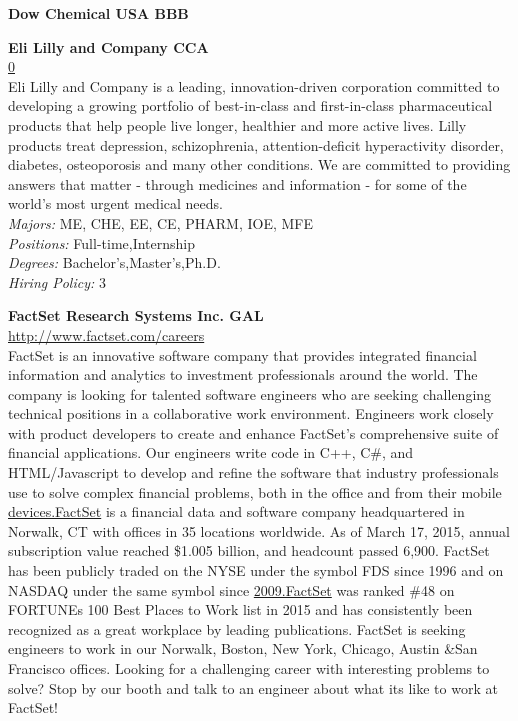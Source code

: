 \documentclass[twoside]{article}
\begin{document}
\begin{center}
\begin{multicols}{2}
\begin{minipage}{.95\columnwidth}{\Large\bf Dow Chemical USA \hfill BBB}
\end{minipage}
 \begin{minipage}{.95\columnwidth}{\Large\bf Eli Lilly and Company \hfill CCA}\\
    \url{0}\\
    Eli Lilly and Company is a leading, innovation-driven corporation committed to developing a growing portfolio of best-in-class and first-in-class pharmaceutical products that help people live longer, healthier and more active lives. Lilly products treat depression, schizophrenia, attention-deficit hyperactivity disorder, diabetes, osteoporosis and many other conditions. We are committed to providing answers that matter - through medicines and information - for some of the world's most urgent medical needs.\\
    \emph{Majors:} ME, CHE, EE, CE, PHARM, IOE, MFE\\
    \emph{Positions:} Full-time,Internship\\
    \emph{Degrees:} Bachelor's,Master's,Ph.D.\\
    \emph{Hiring Policy:} 3\\
\end{minipage}
 \begin{minipage}{.95\columnwidth}{\Large\bf FactSet Research Systems Inc. \hfill GAL}\\
    \url{http://www.factset.com/careers}\\
    FactSet is an innovative software company that provides integrated financial information and analytics to investment professionals around the world. The company is looking for talented software engineers who are seeking challenging technical positions in a collaborative work environment. Engineers work closely with product developers to create and enhance FactSet's comprehensive suite of financial applications. Our engineers write code in C++, C\#, and HTML/Javascript to develop and refine the software that industry professionals use to solve complex financial problems, both in the office and from their mobile \url{devices.FactSet} is a financial data and software company headquartered in Norwalk, CT with offices in 35 locations worldwide. As of March 17, 2015, annual subscription value reached \$1.005 billion, and headcount passed 6,900. FactSet has been publicly traded on the NYSE under the symbol FDS since 1996 and on NASDAQ under the same symbol since \url{2009.FactSet} was ranked \#48 on FORTUNEs 100 Best Places to Work list in 2015 and has consistently been recognized as a great workplace by leading publications. FactSet is seeking engineers to work in our Norwalk, Boston, New York, Chicago, Austin \&San Francisco offices. Looking for a challenging career with interesting problems to solve? Stop by our booth and talk to an engineer about what its like to work at FactSet!\\

\end{minipage}
\end{multicols}
\end{center}
\end{document}
